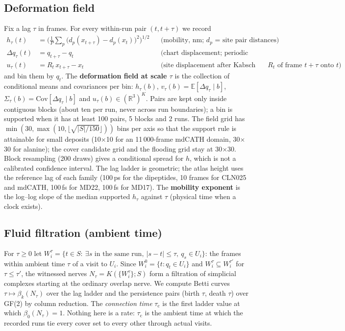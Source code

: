 \documentclass[11pt]{article}
\newcommand{\R}{\mathbb{R}}
\begin{document}
\subsection{Deformation field}\label{sec:field}
Fix a lag $\tau$ in frames. For every within-run pair $(t,t+\tau)$ we record
\begin{align*}
h_\tau(t)&=\Big(\tfrac1P\sum_{p}\big(d_p(x_{t+\tau})-d_p(x_t)\big)^2\Big)^{1/2} &&\text{(mobility, nm; $d_p$ = site pair distances)}\\
\Delta q_\tau(t)&=q_{t+\tau}-q_t &&\text{(chart displacement; periodic difference on the torus)}\\
u_\tau(t)&=R_t\,x_{t+\tau}-x_t &&\text{(site displacement after Kabsch alignment $R_t$ of frame $t+\tau$ onto $t$)}
\end{align*}
and bin them by $q_t$. The \textbf{deformation field at scale $\tau$} is the collection of conditional means and covariances per bin: $h_\tau(b)$, $v_\tau(b)=\mathbb{E}[\Delta q_\tau\mid b]$, $\Sigma_\tau(b)=\mathrm{Cov}[\Delta q_\tau\mid b]$ and $u_\tau(b)\in(\R^3)^K$. Pairs are kept only inside contiguous blocks (about ten per run, never across run boundaries); a bin is supported when it has at least 100 pairs, 5 blocks and 2 runs. The field grid has $\min(30,\max(10,\lfloor\sqrt{|S|/150}\rfloor))$ bins per axis so that the support rule is attainable for small deposits (10$\times$10 for an 11\,000-frame mdCATH domain, 30$\times$30 for alanine); the cover candidate grid and the flooding grid stay at 30$\times$30. Block resampling (200 draws) gives a conditional spread for $h$, which is not a calibrated confidence interval. The lag ladder is geometric; the atlas height uses the reference lag of each family (100\,ps for the dipeptides, 10 frames for CLN025 and mdCATH, 100\,fs for MD22, 100\,fs for MD17). The \textbf{mobility exponent} is the log--log slope of the median supported $h_\tau$ against $\tau$ (physical time when a clock exists).

\subsection{Fluid filtration (ambient time)}\label{sec:fluid}
For $\tau\ge0$ let $W_i^{\tau}=\{t\in S:\ \exists s\text{ in the same run},\ |s-t|\le\tau,\ q_s\in U_i\}$: the frames within ambient time $\tau$ of a visit to $U_i$. Since $W_i^{0}=\{t:q_t\in U_i\}$ and $W_i^{\tau}\subseteq W_i^{\tau'}$ for $\tau\le\tau'$, the witnessed nerves $N_\tau=K(\{W^\tau_i\};S)$ form a filtration of simplicial complexes starting at the ordinary overlap nerve. We compute Betti curves $\tau\mapsto\beta_k(N_\tau)$ over the lag ladder and the persistence pairs (birth $\tau$, death $\tau$) over GF(2) by column reduction. The \emph{connection time} $\tau_{\mathrm{c}}$ is the first ladder value at which $\beta_0(N_\tau)=1$. Nothing here is a rate: $\tau_{\mathrm{c}}$ is the ambient time at which the recorded runs tie every cover set to every other through actual visits.
\end{document}
